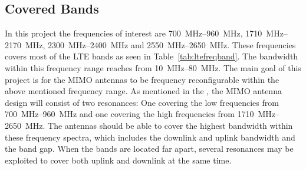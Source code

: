 \subsection{Covered Bands}
In this project the frequencies of interest are \SIrange{700}{960}{MHz}, \SIrange{1710}{2170}{MHz}, \SIrange{2300}{2400}{MHz} and \SIrange{2550}{2650}{MHz}. These frequencies covers most of the LTE bands as seen in Table~\ref{tab:ltefreqband}. The bandwidth within this frequency range reaches from \SIrange{10}{80}{MHz}. The main goal of this project is for the MIMO antennas to be frequency reconfigurable within the above mentioned frequency range. As mentioned in the , the MIMO antenna design will consist of two resonances: One covering the low frequencies from \SIrange{700}{960}{MHz} and one covering the high frequencies from \SIrange{1710}{2650}{MHz}. The antennas should be able to cover the highest bandwidth within these frequency spectra, which includes the downlink and uplink bandwidth and the band gap. When the bands are located far apart, several resonances may be exploited to cover both uplink and downlink at the same time.

